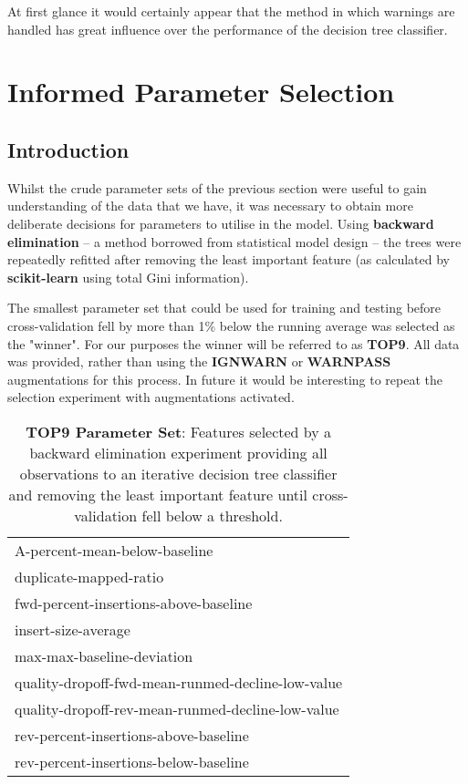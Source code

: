 At first glance it would certainly appear that the method in which warnings are
handled has great influence over the performance of the decision tree
classifier.


\section{Informed Parameter Selection}
\subsection{Introduction}

Whilst the crude parameter sets of the previous section were useful to gain
understanding of the data that we have, it was necessary to obtain more
deliberate decisions for parameters to utilise in the model. Using
\textbf{backward elimination} -- a method borrowed from statistical model design
-- the trees were repeatedly refitted after removing the least important
feature (as calculated by \textbf{scikit-learn} using total Gini information).

The smallest parameter set that could be used for training and testing before
cross-validation fell by more than 1\% below the running average was selected as
the "winner". For our purposes the winner will be referred to as \textbf{TOP9}.
All data was provided, rather than using the \textbf{IGNWARN} or
\textbf{WARNPASS} augmentations for this process. In future it would be
interesting to repeat the selection experiment with augmentations activated.

\begin{table}[H]
    \centering
    \begin{tabular}{l}
        A-percent-mean-below-baseline                     \\
        duplicate-mapped-ratio                            \\
        fwd-percent-insertions-above-baseline             \\
        insert-size-average                               \\
        max-max-baseline-deviation                        \\
        quality-dropoff-fwd-mean-runmed-decline-low-value \\
        quality-dropoff-rev-mean-runmed-decline-low-value \\
        rev-percent-insertions-above-baseline             \\
        rev-percent-insertions-below-baseline             \\
    \end{tabular}

    \caption[top9-params]{\textbf{TOP9 Parameter Set}: Features selected by a
        backward elimination experiment providing all observations to an
        iterative decision tree classifier and removing the least important
        feature until cross-validation fell below a threshold.
    }
    \label{tab:top9-params}
\end{table}


